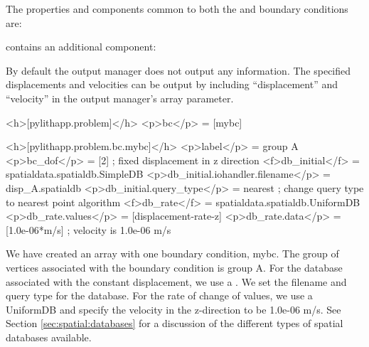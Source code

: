 The properties and components common to both the  and
 boundary conditions are:
\begin{inventory}
\end{inventory}
 contains an additional component:
\begin{inventory}
\end{inventory}
By default the output manager does not output any information. The
specified displacements and velocities can be output by including
``displacement'' and ``velocity'' in the output manager's 
array parameter.

\begin{cfg}
<h>[pylithapp.problem]</h>
<p>bc</p> = [mybc]

<h>[pylithapp.problem.bc.mybc]</h>
<p>label</p> = group A 
<p>bc_dof</p> = [2] ; fixed displacement in z direction
<f>db_initial</f> = spatialdata.spatialdb.SimpleDB
<p>db_initial.iohandler.filename</p> = disp_A.spatialdb
<p>db_initial.query_type</p> = nearest ; change query type to nearest point algorithm
<f>db_rate</f> = spatialdata.spatialdb.UniformDB
<p>db_rate.values</p> = [displacement-rate-z]
<p>db_rate.data</p> = [1.0e-06*m/s] ; velocity is 1.0e-06 m/s
\end{cfg}
We have created an array with one boundary condition, mybc. The group
of vertices associated with the boundary condition is group A. For the
database associated with the constant displacement, we use a
.  We set the filename and query type for the
database. For the rate of change of values, we use a UniformDB and
specify the velocity in the z-direction to be 1.0e-06 m/s. See Section
\vref{sec:spatial:databases} for a discussion of the different types
of spatial databases available.

